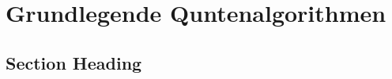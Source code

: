 \chapter{Grundlegende Quntenalgorithmen}
\label{basic_algorithms} %



\section{Section Heading}


\printbibliography
